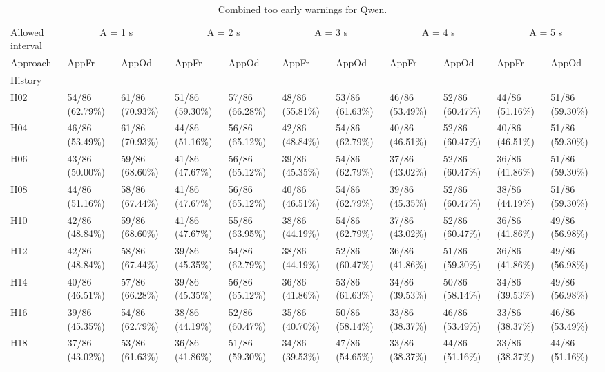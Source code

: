 \begin{table}[tbp]
\caption{Combined too early warnings for Qwen.}
\label{tab:rq4-qwen-too-early-paper-table}
\begin{tabular}{lllllllllll}
\toprule
Allowed interval & \multicolumn{2}{c}{A = 1 s} & \multicolumn{2}{c}{A = 2 s} & \multicolumn{2}{c}{A = 3 s} & \multicolumn{2}{c}{A = 4 s} & \multicolumn{2}{c}{A = 5 s} \\
Approach & AppFr & AppOd & AppFr & AppOd & AppFr & AppOd & AppFr & AppOd & AppFr & AppOd \\
History &  &  &  &  &  &  &  &  &  &  \\
\midrule
H02 & 54/86 (62.79\%) & 61/86 (70.93\%) & 51/86 (59.30\%) & 57/86 (66.28\%) & 48/86 (55.81\%) & 53/86 (61.63\%) & 46/86 (53.49\%) & 52/86 (60.47\%) & 44/86 (51.16\%) & 51/86 (59.30\%) \\
H04 & 46/86 (53.49\%) & 61/86 (70.93\%) & 44/86 (51.16\%) & 56/86 (65.12\%) & 42/86 (48.84\%) & 54/86 (62.79\%) & 40/86 (46.51\%) & 52/86 (60.47\%) & 40/86 (46.51\%) & 51/86 (59.30\%) \\
H06 & 43/86 (50.00\%) & 59/86 (68.60\%) & 41/86 (47.67\%) & 56/86 (65.12\%) & 39/86 (45.35\%) & 54/86 (62.79\%) & 37/86 (43.02\%) & 52/86 (60.47\%) & 36/86 (41.86\%) & 51/86 (59.30\%) \\
H08 & 44/86 (51.16\%) & 58/86 (67.44\%) & 41/86 (47.67\%) & 56/86 (65.12\%) & 40/86 (46.51\%) & 54/86 (62.79\%) & 39/86 (45.35\%) & 52/86 (60.47\%) & 38/86 (44.19\%) & 51/86 (59.30\%) \\
H10 & 42/86 (48.84\%) & 59/86 (68.60\%) & 41/86 (47.67\%) & 55/86 (63.95\%) & 38/86 (44.19\%) & 54/86 (62.79\%) & 37/86 (43.02\%) & 52/86 (60.47\%) & 36/86 (41.86\%) & 49/86 (56.98\%) \\
H12 & 42/86 (48.84\%) & 58/86 (67.44\%) & 39/86 (45.35\%) & 54/86 (62.79\%) & 38/86 (44.19\%) & 52/86 (60.47\%) & 36/86 (41.86\%) & 51/86 (59.30\%) & 36/86 (41.86\%) & 49/86 (56.98\%) \\
H14 & 40/86 (46.51\%) & 57/86 (66.28\%) & 39/86 (45.35\%) & 56/86 (65.12\%) & 36/86 (41.86\%) & 53/86 (61.63\%) & 34/86 (39.53\%) & 50/86 (58.14\%) & 34/86 (39.53\%) & 49/86 (56.98\%) \\
H16 & 39/86 (45.35\%) & 54/86 (62.79\%) & 38/86 (44.19\%) & 52/86 (60.47\%) & 35/86 (40.70\%) & 50/86 (58.14\%) & 33/86 (38.37\%) & 46/86 (53.49\%) & 33/86 (38.37\%) & 46/86 (53.49\%) \\
H18 & 37/86 (43.02\%) & 53/86 (61.63\%) & 36/86 (41.86\%) & 51/86 (59.30\%) & 34/86 (39.53\%) & 47/86 (54.65\%) & 33/86 (38.37\%) & 44/86 (51.16\%) & 33/86 (38.37\%) & 44/86 (51.16\%) \\

\end{tabular}
\end{table}
